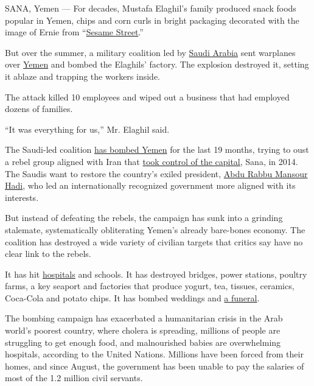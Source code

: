 SANA, Yemen --- For decades, Mustafa Elaghil's family produced snack
foods popular in Yemen, chips and corn curls in bright packaging
decorated with the image of Ernie from
``\href{http://www.sesamestreet.org/}{Sesame Street}.''

But over the summer, a military coalition led by
\href{http://www.nytimes.com/topic/destination/saudi-arabia?8qa}{Saudi
Arabia} sent warplanes over
\href{http://www.nytimes.com/topic/destination/yemen?8qa}{Yemen} and
bombed the Elaghils' factory. The explosion destroyed it, setting it
ablaze and trapping the workers inside.

The attack killed 10 employees and wiped out a business that had
employed dozens of families.

``It was everything for us,'' Mr. Elaghil said.

The Saudi-led coalition
\href{http://www.nytimes.com/2016/10/31/world/middleeast/airstrikes-kill-dozens-in-western-yemen.html?rref=collection\%2Ftimestopic\%2FYemen\&action=click\&contentCollection=world\&region=stream\&module=stream_unit\&version=latest\&contentPlacement=3\&pgtype=collection}{has
bombed Yemen} for the last 19 months, trying to oust a rebel group
aligned with Iran that
\href{http://www.nytimes.com/2014/09/22/world/middleeast/yemens-prime-minister-resigns-amid-chaos-and-another-cease-fire.html}{took
control of the capital}, Sana, in 2014. The Saudis want to restore the
country's exiled president,
\href{http://www.nytimes.com/2015/02/22/world/africa/yemens-former-president-flees-capital.html}{Abdu
Rabbu Mansour Hadi}, who led an internationally recognized government
more aligned with its interests.

But instead of defeating the rebels, the campaign has sunk into a
grinding stalemate, systematically obliterating Yemen's already
bare-bones economy. The coalition has destroyed a wide variety of
civilian targets that critics say have no clear link to the rebels.

It has hit
\href{http://www.nytimes.com/2016/08/16/world/middleeast/yemen-doctors-without-borders-hospital-bombing.html}{hospitals}
and schools. It has destroyed bridges, power stations, poultry farms, a
key seaport and factories that produce yogurt, tea, tissues, ceramics,
Coca-Cola and potato chips. It has bombed weddings and
\href{http://www.nytimes.com/2016/10/09/world/middleeast/yemen-saudi-arabia-houthis-rebels.html}{a
funeral}.

The bombing campaign has exacerbated a humanitarian crisis in the Arab
world's poorest country, where cholera is spreading, millions of people
are struggling to get enough food, and malnourished babies are
overwhelming hospitals, according to the United Nations. Millions have
been forced from their homes, and since August, the government has been
unable to pay the salaries of most of the 1.2 million civil servants.


